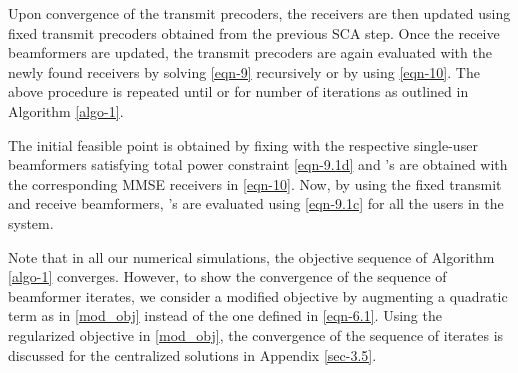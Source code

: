 {Upon convergence of the transmit precoders, the receivers are then updated using fixed transmit precoders  obtained from the previous \ac{SCA} step. Once the receive beamformers are updated, the transmit precoders are again evaluated with the newly found receivers by solving \eqref{eqn-9} recursively or by using \eqref{eqn-10}. The above procedure is repeated until  or for  number of iterations as outlined in Algorithm \ref{algo-1}.

The initial feasible point  is obtained by fixing  with the respective single-user beamformers satisfying total power constraint \eqref{eqn-9.1d} and 's are obtained with the corresponding \ac{MMSE} receivers in \eqref{eqn-10}. Now, by using the fixed transmit and receive beamformers, 's are evaluated using \eqref{eqn-9.1c} for all the users in the system. 

Note that in all our numerical simulations, the objective sequence of Algorithm \ref{algo-1} converges. However, to show the convergence of the sequence of beamformer iterates, we consider a modified objective by augmenting a quadratic term as in \eqref{mod_obj} instead of the one defined in \eqref{eqn-6.1}. Using the regularized objective in \eqref{mod_obj}, the convergence of the sequence of iterates is discussed for the centralized solutions in Appendix \ref{sec-3.5}.}
